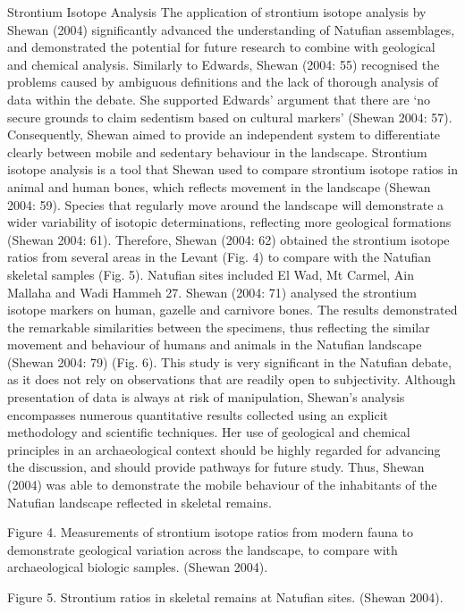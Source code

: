 \documentclass[%
	]{ijsra}
\begin{document}
Strontium Isotope Analysis
The application of strontium isotope analysis by Shewan (2004) significantly advanced the understanding of Natufian assemblages, and demonstrated the potential for future research to combine with geological and chemical analysis. Similarly to Edwards, Shewan (2004: 55) recognised the problems caused by ambiguous definitions and the lack of thorough analysis of data within the debate. She supported Edwards’ argument that there are ‘no secure grounds to claim sedentism based on cultural markers’ (Shewan 2004: 57). Consequently, Shewan aimed to provide an independent system to differentiate clearly between mobile and sedentary behaviour in the landscape. Strontium isotope analysis is a tool that Shewan used to compare strontium isotope ratios in animal and human bones, which reflects movement in the landscape (Shewan 2004: 59). Species that regularly move around the landscape will demonstrate a wider variability of isotopic determinations, reflecting more geological formations (Shewan 2004: 61). Therefore, Shewan (2004: 62) obtained the strontium isotope ratios from several areas in the Levant (Fig. 4) to compare with the Natufian skeletal samples (Fig. 5). Natufian sites included El Wad, Mt Carmel, Ain Mallaha and Wadi Hammeh 27. Shewan (2004: 71) analysed the strontium isotope markers on human, gazelle and carnivore bones. The results demonstrated the remarkable similarities between the specimens, thus reflecting the similar movement and behaviour of humans and animals in the Natufian landscape (Shewan 2004: 79) (Fig. 6). This study is very significant in the Natufian debate, as it does not rely on observations that are readily open to subjectivity. Although presentation of data is always at risk of manipulation, Shewan’s analysis encompasses numerous quantitative results collected using an explicit methodology and scientific techniques. Her use of geological and chemical principles in an archaeological context should be highly regarded for advancing the discussion, and should provide pathways for future study. Thus, Shewan (2004) was able to demonstrate the mobile behaviour of the inhabitants of the Natufian landscape reflected in skeletal remains.

Figure 4. Measurements of strontium isotope ratios from modern fauna to demonstrate geological variation across the landscape, to compare with archaeological biologic samples. (Shewan 2004).

Figure 5. Strontium ratios in skeletal remains at Natufian sites. (Shewan 2004).
\end{document}
